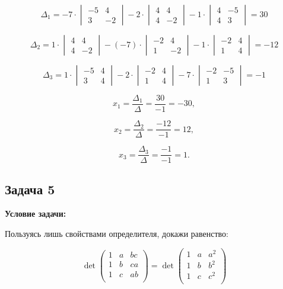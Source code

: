 \documentclass[a4paper,12pt]{article}
\begin{document}
\[
\Delta_1 = 
-7 \cdot \begin{vmatrix}
-5 & 4 \\
3 & -2
\end{vmatrix}
- 2 \cdot \begin{vmatrix}
4 & 4 \\
4 & -2
\end{vmatrix}
-1 \cdot \begin{vmatrix}
4 & -5 \\
4 & 3
\end{vmatrix}=30
\]

\[
\Delta_2 = 
1 \cdot \begin{vmatrix}
4 & 4 \\
4 & -2
\end{vmatrix}
- (-7) \cdot \begin{vmatrix}
-2 & 4 \\
1 & -2
\end{vmatrix}
-1 \cdot \begin{vmatrix}
-2 & 4 \\
1 & 4
\end{vmatrix}=-12
\]

\[
\Delta_3 = 
1 \cdot \begin{vmatrix}
-5 & 4 \\
3 & 4
\end{vmatrix}
- 2 \cdot \begin{vmatrix}
-2 & 4 \\
1 & 4
\end{vmatrix}
-7 \cdot \begin{vmatrix}
-2 & -5 \\
1 & 3
\end{vmatrix}=-1
\]

\[
x_1 = \frac{\Delta_1}{\Delta} = \frac{30}{-1} = -30,
\]

\[
x_2 = \frac{\Delta_2}{\Delta} = \frac{-12}{-1} = 12,
\]

\[
x_3 = \frac{\Delta_3}{\Delta} = \frac{-1}{-1} = 1.
\]

\vspace{1cm}

\subsection{Задача 5}

\textbf{Условие задачи:}

Пользуясь лишь свойствами определителя, докажи равенство:

\[
\det\begin{pmatrix}
1 & a & bc \\
1 & b & ca \\
1 & c & ab \\
\end{pmatrix} = \det\begin{pmatrix}
1 & a & a^2 \\
1 & b & b^2 \\
1 & c & c^2 \\
\end{pmatrix}
\]
\end{document}
